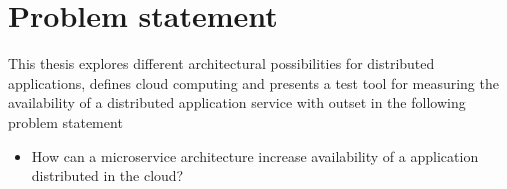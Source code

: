 \section{Problem statement}
\label{sc:problem_statement}

This thesis explores different architectural possibilities for distributed applications, defines cloud computing and presents a test tool for measuring the availability of a distributed application service with outset in the following problem statement

\begin{itemize}
\item How can a microservice architecture increase availability of a application distributed in the cloud?
\end{itemize}